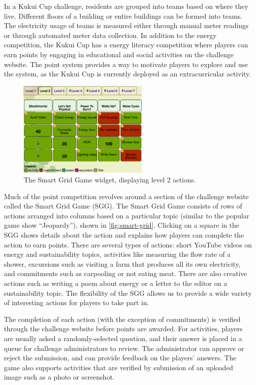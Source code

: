 \documentclass[10pt, conference, compsocconf]{IEEEtran}
\begin{document}
In a Kukui Cup challenge, residents are grouped into teams based on where they live. Different floors of a building or entire buildings can be formed into teams. The electricity usage of teams is measured either through manual meter readings or through automated meter data collection. In addition to the energy competition, the Kukui Cup has a energy literacy competition where players can earn points by engaging in educational and social activities on the challenge website. The point system provides a way to motivate players to explore and use the system, as the Kukui Cup is currently deployed as an extracurricular activity.

\begin{figure}[!tb]
	\centering
	\includegraphics[width=2.5in]{smart-grid2.eps}
	\caption{The Smart Grid Game widget, displaying level 2 actions.}
	\label{fig:smart-grid}
\end{figure}

Much of the point competition revolves around a section of the challenge website called the Smart Grid Game (SGG). The Smart Grid Game consists of rows of actions arranged into columns based on a particular topic (similar to the popular game show ``Jeopardy''), shown in \autoref{fig:smart-grid}. Clicking on a square in the SGG shows details about the action and explains how players can complete the action to earn points. There are several types of actions: short YouTube videos on energy and sustainability topics, activities like measuring the flow rate of a shower, excursions such as visiting a farm that produces all its own electricity, and commitments such as carpooling or not eating meat. There are also creative actions such as writing a poem about energy or a letter to the editor on a sustainability topic. The flexibility of the SGG allows us to provide a wide variety of interesting actions for players to take part in.

The completion of each action (with the exception of commitments) is verified through the challenge website before points are awarded. For activities, players are usually asked a randomly-selected question, and their answer is placed in a queue for challenge administrators to review. The administrator can approve or reject the submission, and can provide feedback on the players' answers. The game also supports activities that are verified by submission of an uploaded image such as a photo or screenshot.
\end{document}
